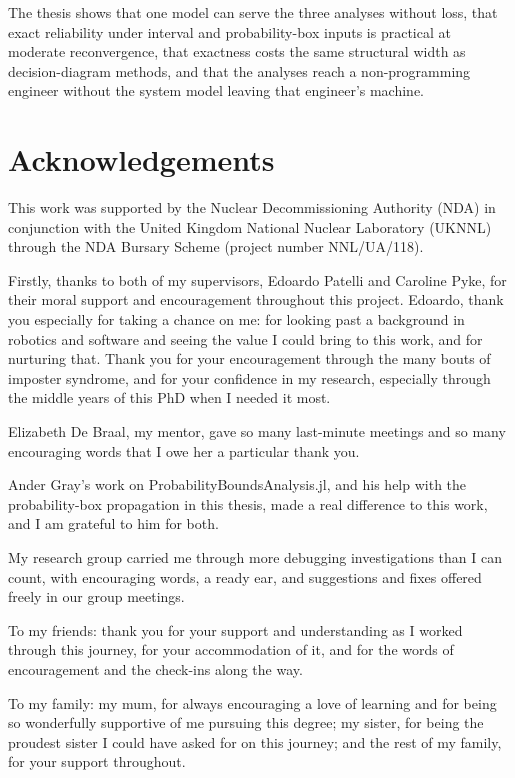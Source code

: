 \documentclass[a4paper,oneside,11pt]{book}
\begin{document}
The thesis shows that one model can serve the three analyses without loss, that exact
reliability under interval and probability-box inputs is practical at moderate
reconvergence, that exactness costs the same structural width as decision-diagram
methods, and that the analyses reach a non-programming engineer without the system model
leaving that engineer's machine.


\chapter*{Acknowledgements}

This work was supported by the Nuclear Decommissioning Authority (NDA) in conjunction
with the United Kingdom National Nuclear Laboratory (UKNNL) through the NDA Bursary Scheme (project number
NNL/UA/118).

Firstly, thanks to both of my supervisors, Edoardo Patelli and Caroline Pyke, for their moral
support and encouragement throughout this project. Edoardo, thank you especially for
taking a chance on me: for looking past a background in robotics and software and seeing
the value I could bring to this work, and for nurturing that. Thank you for your
encouragement through the many bouts of imposter syndrome, and for your confidence in my
research, especially through the middle years of this PhD when I needed it most.

Elizabeth De Braal, my mentor, gave so many last-minute meetings and so many encouraging
words that I owe her a particular thank you.

Ander Gray's work on ProbabilityBoundsAnalysis.jl, and his help with the probability-box
propagation in this thesis, made a real difference to this work, and I am grateful to him
for both.

My research group carried me through more debugging investigations than I can count, with
encouraging words, a ready ear, and suggestions and fixes offered freely in our group
meetings.

To my friends: thank you for your support and understanding as I worked through this
journey, for your accommodation of it, and for the words of encouragement and the
check-ins along the way.

To my family: my mum, for always encouraging a love of learning and for being so
wonderfully supportive of me pursuing this degree; my sister, for being the proudest
sister I could have asked for on this journey; and the rest of my family, for your
support throughout.
\end{document}
